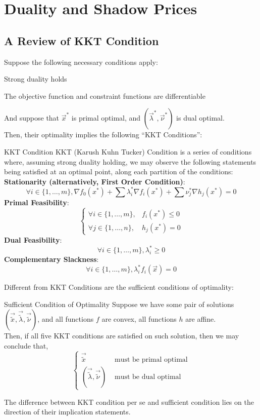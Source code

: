\chapter{Duality and Shadow Prices}

\section{A Review of KKT Condition}
Suppose the following necessary conditions apply:
\begin{bindenum}
    \item Strong duality holds
    \item The objective function and constraint functions are differentiable
\end{bindenum}
And suppose that $\vec{x}^*$ is primal optimal, and $(\vec{\lambda}^*, \vec{\nu}^*)$ is dual optimal. \\
Then, their optimality implies the following ``KKT Conditions'':
\begin{ln-define}{KKT Condition}{}
    KKT (Karush Kuhn Tucker) Condition is a series of conditions where, assuming strong duality holding, we may observe the following statements being satisfied at an optimal point, along each partition of the conditions: \\
    \textbf{Stationarity (alternatively, First Order Condition)}:
    \[
        \forall i \in \{1, \dots, m\}, \nabla f_0(x^*) + \sum \lambda_i^* \nabla {f_i(x^*)} + \sum \nu_j^* \nabla h_j (x^*) = 0
    \]
    \textbf{Primal Feasibility}:
    \[
        \begin{cases}
            \forall i \in \{1, \dots, m\}, &f_i(x^*) \leq 0 \\
            \forall j \in \{1, \dots, n\}, &h_j(x^*) = 0
        \end{cases}
    \]
    \textbf{Dual Feasibility}:
    \[
        \forall i \in \{1, \dots, m\}, \lambda_i^* \geq 0
    \]
    \textbf{Complementary Slackness}:
    \[
        \forall i \in \{1, \dots, m\}, \lambda_i^* f_i(\vec{x}) = 0
    \]
\end{ln-define}

Different from KKT Conditions are the sufficient conditions of optimality:
\begin{ln-define}{Sufficient Condition of Optimality}{}
    Suppose we have some pair of solutions $(\vec{\tilde{x}}, \vec{\tilde{\lambda}}, \vec{\tilde{\nu}})$, and all functions $f$ are convex, all functions $h$ are affine. \\
    Then, if all five KKT conditions are satisfied on such solution, then we may conclude that,
    \[
        \begin{cases}
            \vec{\tilde{x}} &\text{ must be primal optimal} \\
            (\vec{\tilde{\lambda}}, \vec{\tilde{\nu}}) &\text{ must be dual optimal}
        \end{cases}
    \]
\end{ln-define}
The difference between KKT condition per se and sufficient condition lies on the direction of their implication statements.

